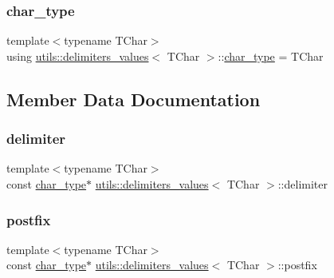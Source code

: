 \subsubsection{\texorpdfstring{char\_type}{char\_type}}
{\footnotesize\ttfamily template$<$typename T\+Char$>$ \\
using \mbox{\hyperlink{structutils_1_1delimiters__values}{utils\+::delimiters\+\_\+values}}$<$ T\+Char $>$\+::\mbox{\hyperlink{structutils_1_1delimiters__values_a57c630ca7c7819e86921e6404a9dd242}{char\+\_\+type}} =  T\+Char}



\subsection{Member Data Documentation}
\mbox{\label{structutils_1_1delimiters__values_a221d9d84700c4da7cc9fe9461aad768e}} 
\subsubsection{\texorpdfstring{delimiter}{delimiter}}
{\footnotesize\ttfamily template$<$typename T\+Char$>$ \\
const \mbox{\hyperlink{structutils_1_1delimiters__values_a57c630ca7c7819e86921e6404a9dd242}{char\+\_\+type}}$\ast$ \mbox{\hyperlink{structutils_1_1delimiters__values}{utils\+::delimiters\+\_\+values}}$<$ T\+Char $>$\+::delimiter}

\mbox{\label{structutils_1_1delimiters__values_a278a31da8954a469212236851e4a22ec}} 
\subsubsection{\texorpdfstring{postfix}{postfix}}
{\footnotesize\ttfamily template$<$typename T\+Char$>$ \\
const \mbox{\hyperlink{structutils_1_1delimiters__values_a57c630ca7c7819e86921e6404a9dd242}{char\+\_\+type}}$\ast$ \mbox{\hyperlink{structutils_1_1delimiters__values}{utils\+::delimiters\+\_\+values}}$<$ T\+Char $>$\+::postfix}

